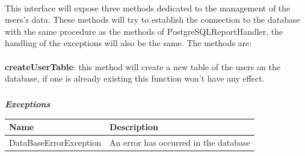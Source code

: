 					\paragraph{}
						This interface will expose three methods dedicated to the management of the users's data. These methods will try to establish the connection to the database with the same procedure as the methods of PostgreSQLReportHandler, the handling of the exceptions will also be the same. The methods are:
					
						\paragraph{}
						\vspace{-1.5mm}
							\textbf{createUserTable}: this method will create a new table of the users on the database, if one is already existing this function won't have any effect.
							\subparagraph{}
							\vspace{-3mm}
								\textit{\textbf{Exceptions}}
								\vspace{-2mm}
									\begin{table}[!h]
									\begin{tabular}{ll}
										\toprule
										\textbf{Name} & \textbf{Description} \\
										\midrule
								  		DataBaseErrorException & An error has occurred in the database \\ 
								 		\bottomrule
									\end{tabular}
								\end{table}
					
